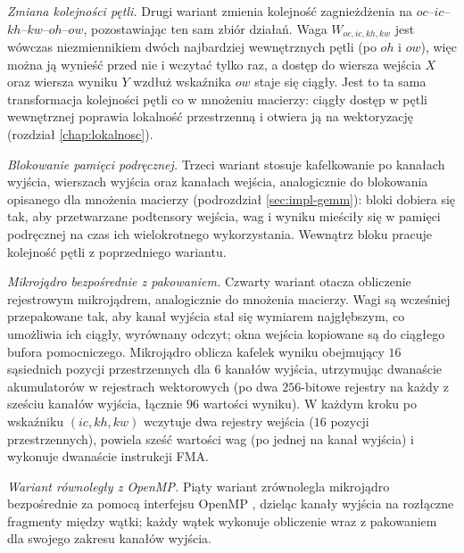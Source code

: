 \documentclass[a4paper,12pt]{book} %
\begin{document}
\emph{Zmiana kolejności pętli.} Drugi wariant zmienia kolejność zagnieżdżenia na $oc$--$ic$--$kh$--$kw$--$oh$--$ow$, pozostawiając ten sam zbiór działań. Waga $W_{oc,ic,kh,kw}$ jest wówczas niezmiennikiem dwóch najbardziej wewnętrznych pętli (po $oh$ i $ow$), więc można ją wynieść przed nie i wczytać tylko raz, a dostęp do wiersza wejścia $X$ oraz wiersza wyniku $Y$ wzdłuż wskaźnika $ow$ staje się ciągły. Jest to ta sama transformacja kolejności pętli co w mnożeniu macierzy: ciągły dostęp w pętli wewnętrznej poprawia lokalność przestrzenną i otwiera ją na wektoryzację (rozdział \ref{chap:lokalnosc}).

\emph{Blokowanie pamięci podręcznej.} Trzeci wariant stosuje kafelkowanie po kanałach wyjścia, wierszach wyjścia oraz kanałach wejścia, analogicznie do blokowania opisanego dla mnożenia macierzy (podrozdział \ref{sec:impl-gemm}): bloki dobiera się tak, aby przetwarzane podtensory wejścia, wag i wyniku mieściły się w pamięci podręcznej na czas ich wielokrotnego wykorzystania. Wewnątrz bloku pracuje kolejność pętli z poprzedniego wariantu.

\emph{Mikrojądro bezpośrednie z pakowaniem.} Czwarty wariant otacza obliczenie rejestrowym mikrojądrem, analogicznie do mnożenia macierzy. Wagi są wcześniej przepakowane tak, aby kanał wyjścia stał się wymiarem najgłębszym, co umożliwia ich ciągły, wyrównany odczyt; okna wejścia kopiowane są do ciągłego bufora pomocniczego. Mikrojądro oblicza kafelek wyniku obejmujący $16$ sąsiednich pozycji przestrzennych dla $6$ kanałów wyjścia, utrzymując dwanaście akumulatorów w rejestrach wektorowych (po dwa $256$-bitowe rejestry na każdy z sześciu kanałów wyjścia, łącznie $96$ wartości wyniku). W każdym kroku po wskaźniku $(ic, kh, kw)$ wczytuje dwa rejestry wejścia ($16$ pozycji przestrzennych), powiela sześć wartości wag (po jednej na kanał wyjścia) i wykonuje dwanaście instrukcji FMA.

\emph{Wariant równoległy z OpenMP.} Piąty wariant zrównolegla mikrojądro bezpośrednie za pomocą interfejsu OpenMP \cite{openmp52}, dzieląc kanały wyjścia na rozłączne fragmenty między wątki; każdy wątek wykonuje obliczenie wraz z pakowaniem dla swojego zakresu kanałów wyjścia.
\end{document}
